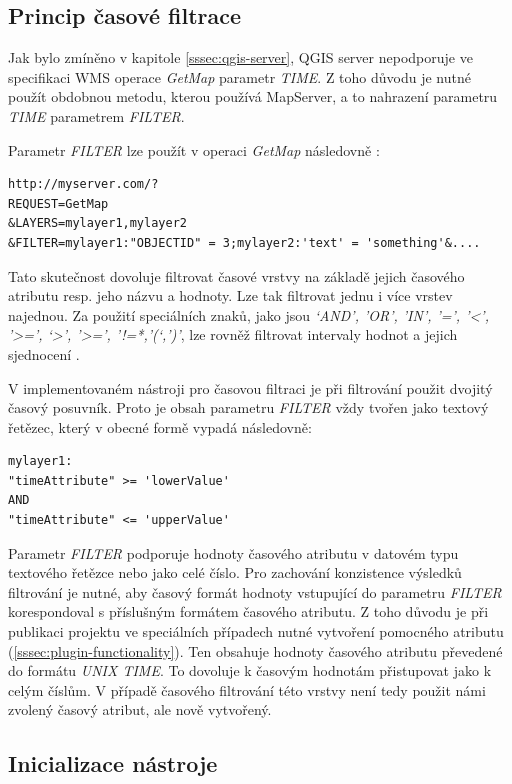 \subsection{Princip časové filtrace}
\label{sssec:time-filtration}

Jak bylo zmíněno v kapitole \ref{sssec:qgis-server}, QGIS server
nepodporuje ve specifikaci WMS operace \textit{GetMap}
parametr \textit{TIME}. Z toho důvodu je nutné použít obdobnou metodu,
kterou používá MapServer, a to nahrazení parametru \textit{TIME}
parametrem \textit{FILTER}.

\noindent
Parametr \textit{FILTER} lze použít v operaci \textit{GetMap} následovně
\cite{qgis-service}:
\begin{verbatim}
http://myserver.com/?
REQUEST=GetMap
&LAYERS=mylayer1,mylayer2
&FILTER=mylayer1:"OBJECTID" = 3;mylayer2:'text' = 'something'&....
\end{verbatim}

Tato skutečnost dovoluje filtrovat časové vrstvy na základě jejich
časového atributu resp. jeho názvu a hodnoty. Lze tak filtrovat jednu
i více vrstev najednou. Za použití speciálních znaků, jako jsou
\textit{‘AND’, ’OR’, ’IN’, ’=’, ’<’, ’>=’,  ‘>’,
’>=’, ’!=*,’(‘,’)’}, lze rovněž filtrovat intervaly hodnot
a jejich sjednocení \cite{qgis-service}.

V implementovaném nástroji pro časovou filtraci je při filtrování použit
dvojitý časový posuvník. Proto je obsah parametru \textit{FILTER} vždy
tvořen jako textový řetězec, který v obecné formě vypadá následovně:

\begin{verbatim}
mylayer1:
"timeAttribute" >= 'lowerValue'
AND
"timeAttribute" <= 'upperValue'
\end{verbatim}

Parametr \textit{FILTER} podporuje hodnoty časového atributu v datovém
typu textového řetězce nebo jako celé číslo. Pro zachování
konzistence výsledků filtrování je nutné, aby časový formát hodnoty
vstupující do parametru \textit{FILTER} korespondoval s příslušným
formátem časového atributu. Z toho důvodu je při publikaci projektu
ve speciálních případech nutné vytvoření pomocného atributu
(\ref{sssec:plugin-functionality}). Ten obsahuje hodnoty časového atributu
převedené do formátu \textit{UNIX TIME}. To dovoluje k časovým hodnotám
přistupovat jako k celým číslům. V případě časového filtrování
této vrstvy není tedy použit námi zvolený časový atribut, ale nově
vytvořený.

\subsection{Inicializace nástroje}
\label{sssec:initialization}

